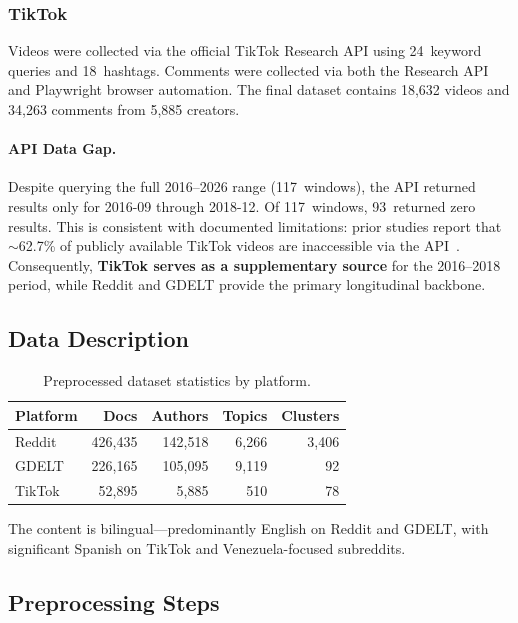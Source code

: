 \documentclass[12pt, a4paper]{article}
\begin{document}
\subsubsection{TikTok}
Videos were collected via the official TikTok Research API using 24~keyword queries and 18~hashtags. Comments were collected via both the Research API and Playwright browser automation. The final dataset contains 18,632 videos and 34,263 comments from 5,885 creators.

\paragraph{API Data Gap.}
Despite querying the full 2016--2026 range (117~windows), the API returned results only for 2016-09 through 2018-12. Of 117~windows, 93~returned zero results. This is consistent with documented limitations: prior studies report that $\sim$62.7\% of publicly available TikTok videos are inaccessible via the API~\cite{aiforensics2024tiktok}. Consequently, \textbf{TikTok serves as a supplementary source} for the 2016--2018 period, while Reddit and GDELT provide the primary longitudinal backbone.

\subsection{Data Description}

\begin{table}[H]
\centering
\caption{Preprocessed dataset statistics by platform.}
\label{tab:data-stats}
\begin{tabular}{@{}lrrrr@{}}
\toprule
\textbf{Platform} & \textbf{Docs} & \textbf{Authors} & \textbf{Topics} & \textbf{Clusters} \\
\midrule
Reddit & 426,435 & 142,518 & 6,266 & 3,406 \\
GDELT  & 226,165 & 105,095 & 9,119 & 92    \\
TikTok &  52,895 &   5,885 &   510 & 78    \\
\bottomrule
\end{tabular}
\end{table}

The content is bilingual---predominantly English on Reddit and GDELT, with significant Spanish on TikTok and Venezuela-focused subreddits.

\subsection{Preprocessing Steps}
\end{document}
